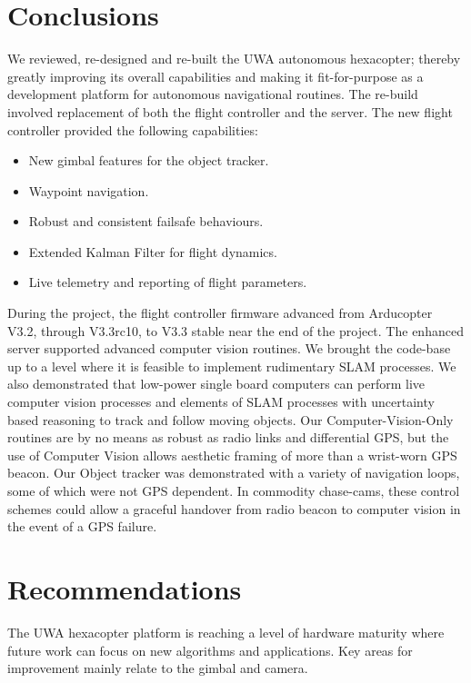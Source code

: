 \documentclass{article}
\begin{document}
\section{Conclusions}

We reviewed, re-designed and re-built the UWA autonomous hexacopter; thereby greatly improving its overall capabilities and making it fit-for-purpose as a development platform for autonomous navigational routines. The re-build involved replacement of both the flight controller and the server. The new flight controller provided the following capabilities:
\begin{itemize}
  \item New gimbal features for the object tracker.
  \item Waypoint navigation.
  \item Robust and consistent failsafe behaviours.
  \item Extended Kalman Filter for flight dynamics.
  \item Live telemetry and reporting of flight parameters.
\end{itemize}

During the project, the flight controller firmware advanced from Arducopter V3.2, through V3.3rc10, to V3.3 stable near the end of the project.
The enhanced server supported advanced computer vision routines.
We brought the code-base up to a level where it is feasible to implement rudimentary SLAM processes. We also demonstrated that low-power single board computers can perform live computer vision processes and elements of SLAM processes with uncertainty based reasoning to track and follow moving objects. Our Computer-Vision-Only routines are by no means as robust as radio links and differential GPS, but the use of Computer Vision allows aesthetic framing of more than a wrist-worn GPS beacon. Our Object tracker was demonstrated with a variety of navigation loops, some of which were not GPS dependent. In commodity chase-cams, these control schemes could allow a graceful handover from radio beacon to computer vision in the event of a GPS failure.


\section{Recommendations}

  The UWA hexacopter platform is reaching a level of hardware maturity where future work can focus on new algorithms and applications.  Key areas for improvement mainly relate to the gimbal and camera.
\end{document}
